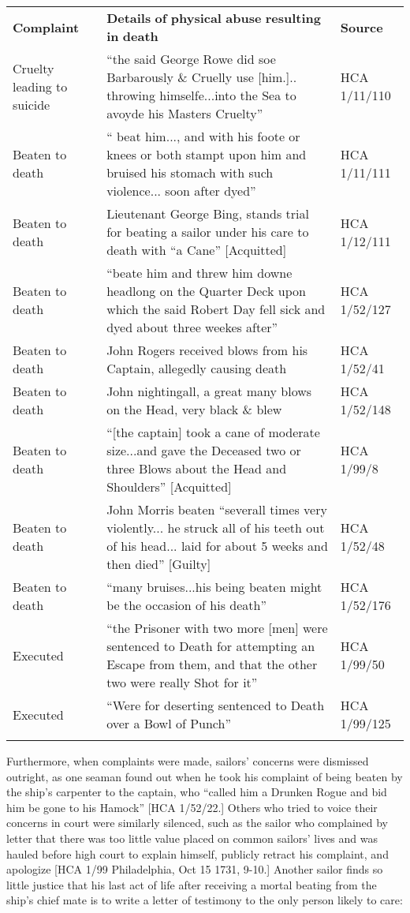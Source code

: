 \begin{tabularx}{\textwidth}{XXX}
\lsptoprule

\textbf{Complaint} & \textbf{Details} \textbf{of} \textbf{physical} \textbf{abuse} \textbf{resulting} \textbf{in} \textbf{death} & \textbf{Source}\\
Cruelty leading to suicide & “the said George Rowe did soe Barbarously \& Cruelly use [him.].. throwing himselfe...into the Sea to avoyde his Masters Cruelty” & HCA 1/11/110\\
Beaten to death & “ beat him..., and with his foote or knees or both stampt upon him and bruised his stomach with such violence... soon after dyed” & HCA 1/11/111\\
Beaten to death & Lieutenant George Bing, stands trial for beating a sailor under his care to death with “a Cane” [Acquitted] & HCA 1/12/111\\
Beaten to death & “beate him and threw him downe headlong on the Quarter Deck upon which the said Robert Day fell sick and dyed about three weekes after” & HCA 1/52/127\\
Beaten to death & John Rogers received blows from his Captain, allegedly causing death & HCA 1/52/41\\
Beaten to death & John nightingall, a great many blows on the Head, very black \& blew & HCA 1/52/148\\
Beaten to death & “[the captain] took a cane of  moderate size...and gave the Deceased two or three Blows about the Head and Shoulders” [Acquitted] & HCA 1/99/8\\
Beaten to death & John Morris beaten “severall times very violently... he struck all of his teeth out of his head... laid for about 5 weeks and then died” [Guilty] & HCA 1/52/48\\
Beaten to death & “many bruises...his being beaten might be the occasion of his death” & HCA 1/52/176\\
Executed & “the Prisoner with two more [men] were sentenced to Death for attempting an Escape from them, and that the other two were really Shot for it” & HCA 1/99/50\\
Executed & “Were for deserting sentenced to Death over a Bowl of Punch” & HCA 1/99/125\\
\lspbottomrule
\end{tabularx}
Furthermore, when complaints were made, sailors’ concerns were dismissed outright, as one seaman found out when he took his complaint of being beaten by the ship’s carpenter to the captain, who “called him a Drunken Rogue and bid him be gone to his Hamock” [HCA 1/52/22.] Others who tried to voice their concerns in court were similarly silenced, such as the sailor who complained by letter that there was too little value placed on common sailors’ lives and was hauled before high court to explain himself, publicly retract his complaint, and apologize [HCA 1/99 Philadelphia, Oct 15 1731, 9-10.] Another sailor finds so little justice that his last act of life after receiving a mortal beating from the ship’s chief mate is to write a letter of testimony to the only person likely to care:


